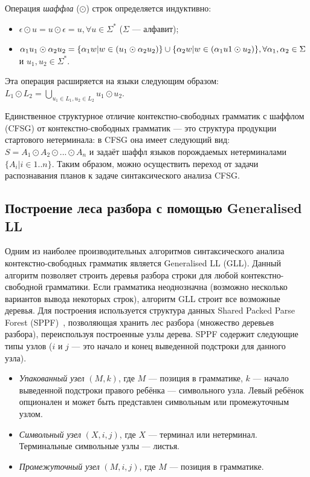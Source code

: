 \documentclass[14pt]{matmex-diploma-custom}
\begin{document}
    Операция \textit{шаффла} ($\odot$) строк определяется индуктивно:
    \begin{itemize}
        \item $\epsilon \odot u = u \odot \epsilon = {u}, \forall u \in \Sigma^*$ ($\Sigma$ --- алфавит);
        \item $\alpha_1 u_1 \odot \alpha_2 u_2 = \{\alpha_1 w | w \in (u_1 \odot \alpha_2 u_2) \} \cup
               \{\alpha_2 w | w \in (\alpha_1 u1 \odot u_2 ) \}, \newline \forall \alpha_1, \alpha_2 \in \Sigma$ и $u_1, u_2 \in \Sigma^*$.
    \end{itemize}
    
    Эта операция расширяется на языки следующим образом: \newline $L_1 \odot L_2 = \bigcup\limits_{u_1\in L_1, u_2\in L_2} u_1 \odot u_2$.
    
    Единственное структурное отличие контекстно-свободных грамматик с шаффлом (CFSG) от контекстно-свободных грамматик
    --- это структура продукции стартового нетерминала: в CFSG она имеет следующий
    вид: $S = A_1 \odot A_2 \odot ... \odot A_n$
    и задаёт шаффл языков порождаемых нетерминалами $\{A_i | i \in 1..n\}$. %
    Таким образом, можно осуществить переход от задачи распознавания планов к задаче синтаксического анализа CFSG.%
    
    \subsection{Построение леса разбора с помощью Generalised LL}
    Одним из наиболее производительных алгоритмов синтаксического анализа контекстно-свободных грамматик является
    Generalised LL (GLL). Данный алгоритм
    позволяет строить деревья разбора строки для любой контекстно-свободной грамматики. Если грамматика неоднозначна
    (возможно несколько вариантов вывода некоторых строк), алгоритм GLL строит все возможные деревья. Для построения используется структура данных Shared Packed Parse Forest (SPPF)~\cite{GLLSPPF}, позволяющая хранить лес разбора (множество деревьев разбора), переиспользуя построенные
    узлы дерева. SPPF содержит следующие типы узлов ($i$ и $j$ --- это начало и конец выведенной подстроки для данного узла).
    
    \begin{itemize}
    	\item \textit{Упакованный узел} $(M, k)$, где $M$ --- позиция в грамматике, $k$ --- начало выведенной
    	подстроки правого ребёнка --- символьного узла. Левый ребёнок опционален и может быть 
    	представлен символьным или промежуточным узлом.
    	\item \textit{Символьный узел} $(X, i, j)$, где $X$ --- терминал или нетерминал.
    	Терминальные символьные узлы --- листья. 
    	\item \textit{Промежуточный узел} $ (M, i, j) $, где $M$ --- позиция в грамматике.
    \end{itemize}
\end{document}
